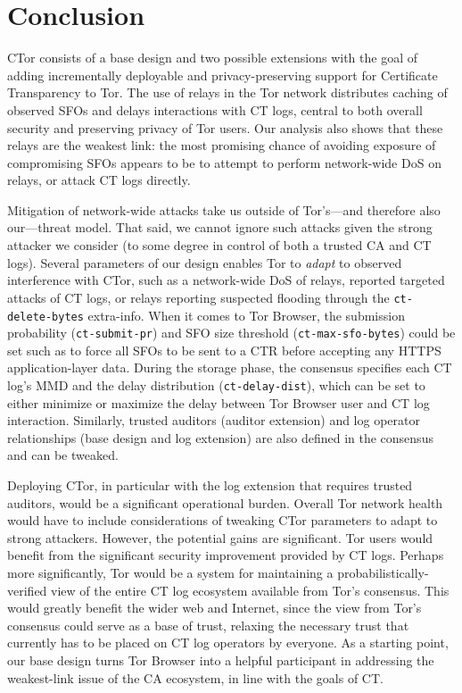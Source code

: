 \section{Conclusion} \label{sec:conclusion}
CTor consists of a base design and two possible extensions with the goal of
adding incrementally deployable and privacy-preserving support for Certificate
Transparency to Tor. The use of relays in the Tor network distributes caching of
observed SFOs and delays interactions with CT logs, central to both overall
security and preserving privacy of Tor users. Our analysis also shows that these
relays are the weakest link: the most promising chance of avoiding exposure of
compromising SFOs appears to be to attempt to perform network-wide DoS on
relays, or attack CT logs directly. 

Mitigation of network-wide attacks take us outside of Tor's---and therefore also
our---threat model. That said, we cannot ignore such attacks given the strong
attacker we consider (to some degree in control of both a trusted CA and CT
logs). Several parameters of our design enables Tor to \emph{adapt} to observed
interference with CTor, such as a network-wide DoS of relays, reported targeted
attacks of CT logs, or relays reporting suspected flooding through the
\texttt{ct-delete-bytes}  extra-info. When it comes to Tor Browser, the
submission probability (\texttt{ct-submit-pr}) and SFO size threshold
(\texttt{ct-max-sfo-bytes}) could be set such as to force all SFOs to be sent to
a CTR before accepting any HTTPS application-layer data. During the storage
phase, the consensus specifies each CT log's MMD and the delay distribution
(\texttt{ct-delay-dist}), which can be set to either minimize or maximize the
delay between Tor Browser user and CT log interaction. Similarly, trusted
auditors (auditor extension) and log operator relationships (base design and log
extension) are also defined in the consensus and can be tweaked.

Deploying CTor, in particular with the log extension that requires trusted
auditors, would be a significant operational burden. Overall Tor network health
would have to include considerations of tweaking CTor parameters to adapt to
strong attackers. However, the potential gains are significant. Tor users would
benefit from the significant security improvement provided by CT logs. Perhaps
more significantly, Tor would be a system for maintaining a
probabilistically-verified view of the entire CT log ecosystem available from
Tor’s consensus. This would greatly benefit the wider web and Internet, since
the view from Tor's consensus could serve as a base of trust, relaxing the
necessary trust that currently has to be placed on CT log operators by everyone.
As a starting point, our base design turns Tor Browser into a helpful
participant in addressing the weakest-link issue of the CA ecosystem, in line
with the goals of CT.

